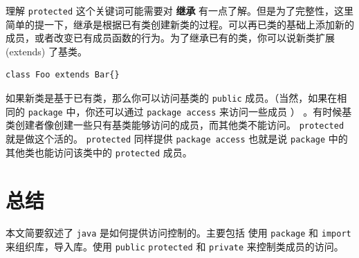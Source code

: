 \documentclass[10pt,a4paper,UTF8]{article}
\begin{document}
理解 \texttt{protected} 这个关键词可能需要对 \textbf{继承} 有一点了解。但是为了完整性，这里简单的提一下，继承是根据已有类创建新类的过程。可以再已类的基础上添加新的成员，或者改变已有成员函数的行为。为了继承已有的类，你可以说新类扩展 (extends) 了基类。
\begin{verbatim}
class Foo extends Bar{}
\end{verbatim}

如果新类是基于已有类，那么你可以访问基类的 \texttt{public} 成员。（当然，如果在相同的 \texttt{package} 中，你还可以通过 \texttt{package access} 来访问一些成员 ） 。有时候基类创建者像创建一些只有基类能够访问的成员，而其他类不能访问。 \texttt{protected} 就是做这个活的。 \texttt{protected} 同样提供 \texttt{package access} 也就是说 \texttt{package} 中的其他类也能访问该类中的 \texttt{protected} 成员。
\section{总结}
\label{sec:org566aa60}


本文简要叙述了 \texttt{java} 是如何提供访问控制的。主要包括 使用 \texttt{package} 和 \texttt{import} 来组织库，导入库。使用 \texttt{public} \texttt{protected} 和 \texttt{private} 来控制类成员的访问。
\end{document}
